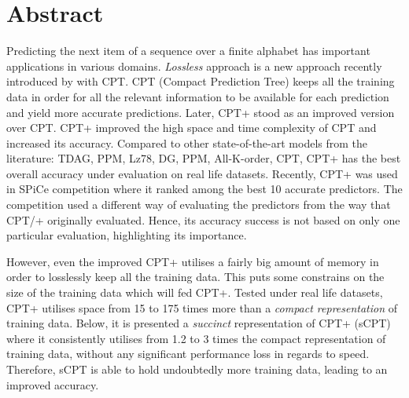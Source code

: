 \begin{comment}
							

\end{comment}

\section*{Abstract}
Predicting the next item of a sequence over a finite alphabet has important applications in various domains. \emph{Lossless} approach is a new approach  recently introduced by \citeauthor{gueniche_fournier-viger_tseng_2013} \citeyear{gueniche_fournier-viger_tseng_2013} with CPT. CPT (Compact Prediction Tree) keeps all the training data in order for all the relevant information to be available for each prediction and yield more accurate predictions. Later, CPT+ \cite{gueniche_fournier-viger_raman_tseng_2015} stood as an improved version over CPT. CPT+ improved the high space and time complexity of CPT and increased its accuracy. Compared to other state-of-the-art models from the literature: TDAG, PPM, Lz78, DG, PPM, All-K-order, CPT, CPT+ has the best overall accuracy under evaluation on real life datasets. Recently, CPT+ was used in SPiCe \cite{balle:hal-01399429} competition where it ranked among the best 10 accurate predictors. The competition used a different way of evaluating the predictors from the way that CPT/+ originally evaluated. Hence, its accuracy success is not based on only one particular evaluation, highlighting its importance. 
\par However, even the improved CPT+ utilises a fairly big amount of memory in order to losslessly keep all the training data. This puts some constrains on the size of the training data which will fed CPT+. Tested under real life datasets, CPT+ utilises space from 15 to 175 times more than a \emph{compact representation} of training data. Below, it is presented a \emph{succinct} representation of CPT+ (sCPT) where it consistently utilises from 1.2 to 3  times the compact representation of training data, without any significant performance loss in regards to speed. Therefore, sCPT is able to hold undoubtedly more training data, leading to an improved accuracy.


